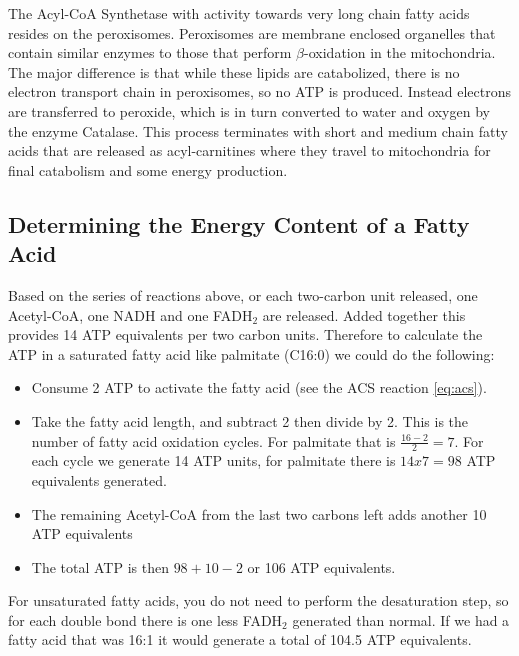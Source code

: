 \documentclass{tufte-handout}
\begin{document}
  The Acyl-CoA Synthetase with activity towards very long chain fatty acids resides on the peroxisomes.  Peroxisomes are membrane enclosed organelles that contain similar enzymes to those that perform $\beta$-oxidation in the mitochondria.  The major difference is that while these lipids are catabolized, there is no electron transport chain in peroxisomes, so no ATP is produced.  Instead electrons are transferred to peroxide, which is in turn converted to water and oxygen by the enzyme Catalase.  This process terminates with short and medium chain fatty acids that are released as acyl-carnitines where they travel to mitochondria for final catabolism and some energy production.

\subsection{Determining the Energy Content of a Fatty Acid}

Based on the series of reactions above, or each two-carbon unit released, one Acetyl-CoA, one NADH and one FADH$_2$ are released.  Added together this provides 14 ATP equivalents per two carbon units.  Therefore to calculate the ATP in a saturated fatty acid like palmitate (C16:0) we could do the following:

\begin{itemize}
\item Consume 2 ATP to activate the fatty acid (see the ACS reaction \ref{eq:acs}).
\item Take the fatty acid length, and subtract 2 then divide by 2.  This is the number of fatty acid oxidation cycles.  For palmitate that is $\frac{16-2}{2}=7$.  For each cycle we generate 14 ATP units, for palmitate there is $14 x 7 = 98$ ATP equivalents generated.
\item The remaining Acetyl-CoA from the last two carbons left adds another 10 ATP equivalents
\item The total ATP is then $98+10-2$ or 106 ATP equivalents.
\end{itemize}

For unsaturated fatty acids, you do not need to perform the desaturation step, so for each double bond there is one less FADH$_2$ generated than normal.  If we had a fatty acid that was 16:1 it would generate a total of 104.5 ATP equivalents.
\end{document}
